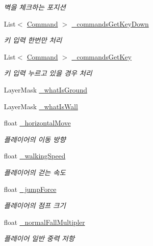 \begin{DoxyCompactItemize}
\begin{DoxyCompactList}\small\item\em 벽을 체크하는 포지션 \end{DoxyCompactList}\item 
List$<$ \mbox{\hyperlink{class_command}{Command}} $>$ \mbox{\hyperlink{class_player_controller_a5418f7d3731c414ed28502afd16850bc}{\+\_\+commands\+Get\+Key\+Down}}
\begin{DoxyCompactList}\small\item\em 키 입력 한번만 처리 \end{DoxyCompactList}\item 
List$<$ \mbox{\hyperlink{class_command}{Command}} $>$ \mbox{\hyperlink{class_player_controller_ab66639be3aea728b512abeb05c21396e}{\+\_\+commands\+Get\+Key}}
\begin{DoxyCompactList}\small\item\em 키 입력 누르고 있을 경우 처리 \end{DoxyCompactList}\item 
Layer\+Mask \mbox{\hyperlink{class_player_controller_a9e49eccbc78237a2355490b7df08368d}{\+\_\+what\+Is\+Ground}}
\item 
Layer\+Mask \mbox{\hyperlink{class_player_controller_a00e0ccedea38a9796587bcfc765d193e}{\+\_\+what\+Is\+Wall}}
\item 
float \mbox{\hyperlink{class_player_controller_af8d3915645f93ede0aaedfdd343c33d1}{\+\_\+horizontal\+Move}}
\begin{DoxyCompactList}\small\item\em 플레이어의 이동 방향 \end{DoxyCompactList}\item 
float \mbox{\hyperlink{class_player_controller_a1ab6a7892eecf1a9fa7b1a49842a3dd2}{\+\_\+walking\+Speed}}
\begin{DoxyCompactList}\small\item\em 플레이어의 걷는 속도 \end{DoxyCompactList}\item 
float \mbox{\hyperlink{class_player_controller_aaec5e4333fe1c532900ca666c075261c}{\+\_\+jump\+Force}}
\begin{DoxyCompactList}\small\item\em 플레이어의 점프 크기 \end{DoxyCompactList}\item 
float \mbox{\hyperlink{class_player_controller_aa38f479e2486aa4a84a9281e4788dd0c}{\+\_\+normal\+Fall\+Multipler}}
\begin{DoxyCompactList}\small\item\em 플레이어 일반 중력 저항 \end{DoxyCompactList}\item 

\end{DoxyCompactItemize}
